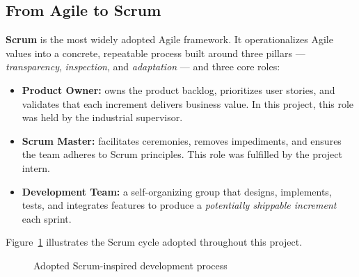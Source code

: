 \subsection{From Agile to Scrum}

\textbf{Scrum} is the most widely adopted Agile framework. It operationalizes Agile values into
a concrete, repeatable process built around three pillars — \textit{transparency},
\textit{inspection}, and \textit{adaptation} — and three core roles:

\begin{itemize}
  \item \textbf{Product Owner:} owns the product backlog, prioritizes user stories, and
    validates that each increment delivers business value. In this project, this role was held
    by the industrial supervisor.

  \item \textbf{Scrum Master:} facilitates ceremonies, removes impediments, and ensures the
    team adheres to Scrum principles. This role was fulfilled by the project intern.

  \item \textbf{Development Team:} a self-organizing group that designs, implements, tests,
    and integrates features to produce a \textit{potentially shippable increment} each sprint.
\end{itemize}

Figure~\ref{fig:scrum} illustrates the Scrum cycle adopted throughout this project.

\begin{figure}[H]
\centering
{}
\caption{Adopted Scrum-inspired development process}
\label{fig:scrum}
\end{figure}

